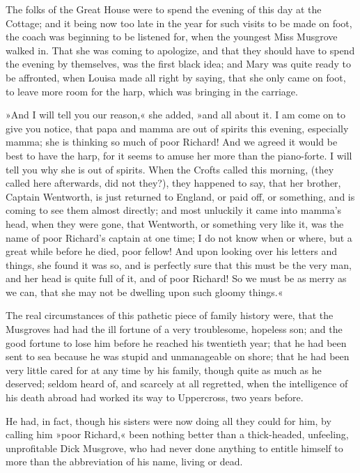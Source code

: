 The folks of the Great House were to spend the evening of this day at the Cottage; and it being now too late in the year for such visits to be made on foot, the coach was beginning to be listened for, when the youngest Miss Musgrove walked in. That she was coming to apologize, and that they should have to spend the evening by themselves, was the first black idea; and Mary was quite ready to be affronted, when Louisa made all right by saying, that she only came on foot, to leave more room for the harp, which was bringing in the carriage.

»And I will tell you our reason,« she added, »and all about it. I am come on to give you notice, that papa and mamma are out of spirits this evening, especially mamma; she is thinking so much of poor Richard! And we agreed it would be best to have the harp, for it seems to amuse her more than the piano-forte. I will tell you why she is out of spirits. When the Crofts called this morning, (they called here afterwards, did not they?), they happened to say, that her brother, Captain Wentworth, is just returned to England, or paid off, or something, and is coming to see them almost directly; and most unluckily it came into mamma's head, when they were gone, that Wentworth, or something very like it, was the name of poor Richard's captain at one time; I do not know when or where, but a great while before he died, poor fellow! And upon looking over his letters and things, she found it was so, and is perfectly sure that this must be the very man, and her head is quite full of it, and of poor Richard! So we must be as merry as we can, that she may not be dwelling upon such gloomy things.«

The real circumstances of this pathetic piece of family history were, that the Musgroves had had the ill fortune of a very troublesome, hopeless son; and the good fortune to lose him before he reached his twentieth year; that he had been sent to sea because he was stupid and unmanageable on shore; that he had been very little cared for at any time by his family, though quite as much as he deserved; seldom heard of, and scarcely at all regretted, when the intelligence of his death abroad had worked its way to Uppercross, two years before.

He had, in fact, though his sisters were now doing all they could for him, by calling him »poor Richard,« been nothing better than a thick-headed, unfeeling, unprofitable Dick Musgrove, who had never done anything to entitle himself to more than the abbreviation of his name, living or dead.

